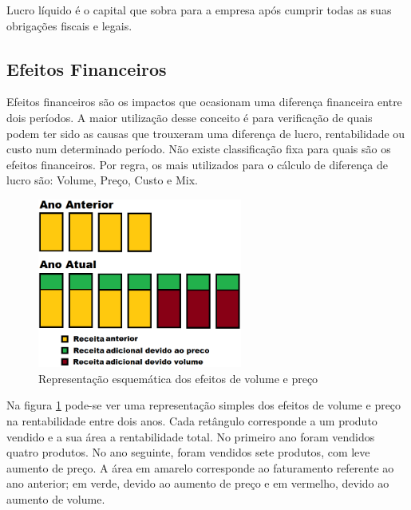 \documentclass[12pt]{article}
\begin{document}
	Lucro líquido é o capital que sobra para a empresa após cumprir todas as suas obrigações fiscais e legais.

\subsection{Efeitos Financeiros}

	Efeitos financeiros são os impactos que ocasionam uma diferença financeira entre dois períodos. A maior utilização desse conceito é para verificação de quais podem ter sido as causas que trouxeram uma diferença de lucro, rentabilidade ou custo num determinado período. Não existe classificação fixa para quais são os efeitos financeiros. Por regra, os mais utilizados para o cálculo de diferença de lucro são: Volume, Preço, Custo e Mix.

\begin{figure}[h!]
	\centering
	\includegraphics[width=0.6\textwidth]{img/effects.png}
	\caption{Representação esquemática dos efeitos de volume e preço}
	\label{fig:effects}
\end{figure}

	Na figura \ref{fig:effects} pode-se ver uma representação simples dos efeitos de volume e preço na rentabilidade entre dois anos. Cada retângulo corresponde a um produto vendido e a sua área a rentabilidade total. No primeiro ano foram vendidos quatro produtos. No ano seguinte, foram vendidos sete produtos, com leve aumento de preço. A área em amarelo corresponde ao faturamento referente ao ano anterior; em verde, devido ao aumento de preço e em vermelho, devido ao aumento de volume.

\end{document}
